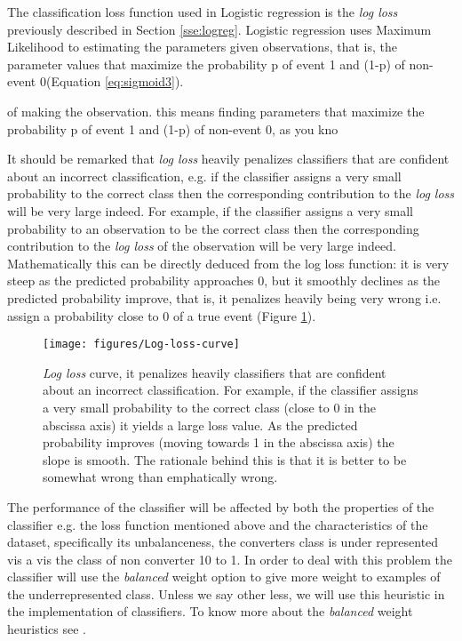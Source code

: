 \documentclass[11pt]{article}
\theoremstyle{definition}
\theoremstyle{remark}
\begin{document}
The classification loss function used in Logistic regression is the \emph{log loss} previously described in Section \ref{sse:logreg}. Logistic regression uses Maximum Likelihood to estimating the parameters given observations, that is, the parameter values that maximize the probability p of event 1 and (1-p) of non-event 0(Equation \ref{eq:sigmoid3}).


of making the observation. this means finding parameters that maximize the probability p of event 1 and (1-p) of non-event 0, as you kno

It should be remarked that \emph{log loss} heavily penalizes classifiers that are confident about an incorrect classification, e.g. if the classifier assigns a very small probability to the correct class then the corresponding contribution to the \emph{log loss} will be very large indeed. 
For example, if the classifier assigns a very small probability to an observation to be the correct class then the corresponding contribution to the \emph{log loss} of the observation will be very large indeed. Mathematically this can be directly deduced from the log loss function: it is very steep as the predicted probability approaches 0, but it smoothly declines as the predicted probability improve, that is, it penalizes heavily being very wrong i.e. assign a probability close to 0 of a true event (Figure \ref{fig:Log-loss-curve}). 
\begin{figure}[H]
        \centering
        \texttt{[image: figures/Log-loss-curve]}
        \caption{\emph{Log loss} curve, it penalizes heavily classifiers that are confident about an incorrect classification. For example, if the classifier assigns a very small probability to the correct class (close to 0 in the abscissa axis) it yields a large loss value. As the predicted probability improves (moving towards 1 in the  abscissa axis) the slope is smooth. The rationale behind this is that it is better to be somewhat wrong than emphatically wrong. 
        }
\label{fig:Log-loss-curve}
\end{figure}

The performance of the classifier will be affected by both the properties of the classifier e.g. the loss function mentioned above and the characteristics of the dataset, specifically its unbalanceness, the converters class is under represented vis a vis the class of non converter 10 to 1. In order to deal with this problem the classifier will use the \emph{balanced} weight option to give more weight to examples of the underrepresented class. Unless we say other less, we will use this heuristic in the implementation of classifiers. To know more about the \emph{balanced} weight heuristics see \cite{king2001logistic}. 
\end{document}
